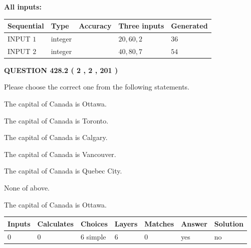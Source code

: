 \documentclass[12pt]{article}
\begin{document}
   
   
   
\noindent\vspace{0.1in}\hspace{-0.08in} {\textbf{\Large{All inputs: }}}
   
   
  
  
\noindent\begin{tabular}{|l|l|l|l|l|}
\hline
 Sequential & Type & Accuracy & Three inputs & Generated \\ 
\hline
 
 
  INPUT $  1 $ & integer &  & $
 20
 , 
 60
 , 
 2
 $ & $ 36 $ 
 \\  \hline  
 
 
  INPUT $  2 $ & integer &  & $
 40
 , 
 80
 , 
 7
 $ & $ 54 $ 
 \\  \hline  
 \end{tabular}
   
   
  
\vspace{0.2in}
  
{\textbf{\Large{QUESTION
428.2 
 ( 2 , 2 , 201 )
}}}
  
  
Please choose the correct one from the following statements.
 
 
The capital of Canada is Ottawa.
 
 
The capital of Canada is Toronto.
 
 
The capital of Canada is Calgary.
 
 
The capital of Canada is Vancouver.
 
 
The capital of Canada is Quebec City.
 
 
 None of above.
 
 
\noindent{}
 
 
The capital of Canada is Ottawa.
 
 
\noindent{}
 
 
   
   
   
   
\noindent\begin{tabular}{|l|l|l|l|l|l|l|}
 \hline
Inputs & Calculates & Choices & Layers & Matches & Answer & Solution \\ \hline
 0  & 
 0  & 
 6
  simple  
  & 
 6  & 
 0  & 
  yes & 
  no 
  \\ \hline
 \end{tabular}
   
\end{document}
